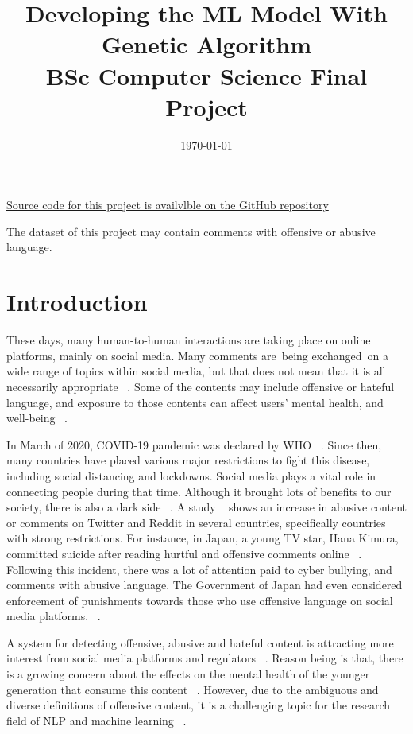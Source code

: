 \documentclass[11pt, natbib=false]{article}
\date{\today}
\title{%
  Developing the ML Model With Genetic Algorithm \\
  \large BSc Computer Science Final Project
}
\begin{document}
\maketitle
\href{https://github.com/hayacon/cs_final_project}{Source code for this project is availvlble on the GitHub repository}


The dataset of this project may contain comments with offensive or abusive language.
\section{Introduction}
These days, many human-to-human interactions are taking place on online platforms, mainly on social media.
Many comments are being exchanged on a wide range of topics within social media, but that does not mean that it is all necessarily appropriate ~\cite{hada2021ruddit}.
Some of the contents may include offensive or hateful language, and exposure to those contents can affect users’ mental health, and well-being ~\cite{hada2021ruddit}.

In March of 2020, COVID-19 pandemic was declared by WHO ~\cite{whoCovid}.
Since then, many countries have placed various major restrictions to fight this disease, including social distancing and lockdowns. Social media plays a vital role in connecting people during that time. Although it brought lots of benefits to our society, there is also a dark side ~\cite{liu2021covid}.
A study ~\cite{babvey2021using} shows an increase in abusive content or comments on Twitter and Reddit in several countries, specifically countries with strong restrictions.
For instance, in Japan, a young TV star, Hana Kimura, committed suicide after reading hurtful and offensive comments online ~\cite{HanaK}.
Following this incident, there was a lot of attention paid to cyber bullying, and comments with abusive language. The Government of Japan had even considered enforcement of punishments towards those who use offensive language on social media platforms. ~\cite{JpGov}.


A system for detecting offensive, abusive and hateful content is attracting more interest from social media platforms and regulators ~\cite{vidgen2019challenges}.
Reason being is that, there is a growing concern about the effects on the mental health of the younger generation that consume this content ~\cite{babvey2021using}.
However, due to the ambiguous and diverse definitions of offensive content, it is a challenging topic for the research field of NLP and machine learning ~\cite{vidgen2019challenges}.
\end{document}
